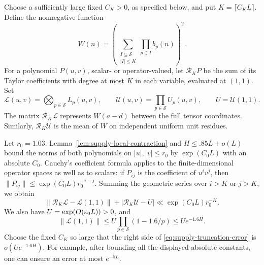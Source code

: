 Choose a sufficiently large fixed \(C_K>0\), as specified below, and put
\(K=\lceil C_KL\rceil\). Define the nonnegative function
\begin{equation}\label{eq:supply-weight}
 W(n)=
 \left(\sum_{\substack{I\subseteq\mathcal S\\|I|\le K}}
              \prod_{p\in I}b_p(n)\right)^2.
\end{equation}
For a polynomial \(P(u,v)\), scalar- or operator-valued, let
\(\mathcal R_K P\) be the sum of its Taylor coefficients with degree
at most \(K\) in each variable, evaluated at \((1,1)\).
Set
\[
 \mathcal L(u,v)=\bigotimes_{p\in\mathcal S}L_p(u,v),\qquad
 \mathcal U(u,v)=\prod_{p\in\mathcal S}U_p(u,v),\qquad
 U=\mathcal U(1,1).
\]
The matrix \(\mathcal R_K\mathcal L\) represents \(W(a-d)\) between
the full tensor coordinates. Similarly,
\(\mathcal R_K\mathcal U\) is the mean of \(W\) on independent
uniform unit residues.

Let \(r_0=1.03\). Lemma~\ref{lem:supply-local-contraction} and
\(H\le .85L+o(L)\) bound the norms of both polynomials on
\(|u|,|v|\le r_0\) by \(\exp(C_0L)\) with an absolute \(C_0\).
Cauchy's coefficient formula applies to the finite-dimensional
operator spaces as well as to scalars: if \(P_{ij}\) is the
coefficient of \(u^iv^j\), then
\(\|P_{ij}\|\le\exp(C_0L)r_0^{-i-j}\).
Summing the geometric series over \(i>K\) or \(j>K\), we obtain
\begin{equation}\label{eq:supply-truncation-error}
 \|\mathcal R_K\mathcal L-\mathcal L(1,1)\|
 +|\mathcal R_K\mathcal U-U|
 \ll \exp(C_0L)r_0^{-K}.
\end{equation}
We also have \(U=\exp(O(\varepsilon_0L))>0\), and
\[
 \|\mathcal L(1,1)\|
 \le U\prod_{p\in\mathcal S}(1-1.6/p)
 \le Ue^{-1.6H}.
\]
Choose the fixed \(C_K\) so large that the right side of
\eqref{eq:supply-truncation-error} is \(o(Ue^{-1.6H})\).
For example, after bounding all the displayed absolute constants,
one can ensure an error at most \(e^{-5L}\).

